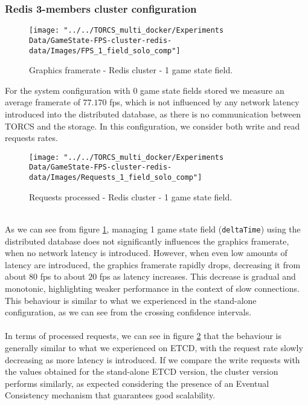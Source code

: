\subsubsection{Redis 3-members cluster configuration}
\begin{figure}[h!]
	\centering
	\texttt{[image: "../../TORCS\_multi\_docker/Experiments Data/GameState-FPS-cluster-redis-data/Images/FPS\_1\_field\_solo\_comp"]}
	\caption[Graphics framerate - Redis cluster - 1 game state field]{Graphics framerate - Redis cluster - 1 game state field.}
	\label{fig:fps-1-field-redis-cluster}
\end{figure}
For the system configuration with 0 game state fields stored we measure an average framerate of $77.170$ fps, which is not influenced by any network latency introduced into the distributed database, as there is no communication between TORCS and the storage. In this configuration, we consider both write and read requests rates. \\
\begin{figure}[h!]
	\centering
	\texttt{[image: "../../TORCS\_multi\_docker/Experiments Data/GameState-FPS-cluster-redis-data/Images/Requests\_1\_field\_solo\_comp"]}
	\caption[Requests processed - Redis cluster - 1 game state field]{Requests processed - Redis cluster - 1 game state field.}
	\label{fig:requests-1-field-redis-cluster}
\end{figure}
\\ As we can see from figure \ref{fig:fps-1-field-redis-cluster}, managing 1 game state field (\texttt{deltaTime}) using the distributed database does not significantly influences the graphics framerate, when no network latency is introduced. However, when even low amounts of latency are introduced, the graphics framerate rapidly drops, decreasing it from about $80$ fps to about $20$ fps as latency increases. This decrease is gradual and monotonic, highlighting weaker performance in the context of slow connections. This behaviour is similar to what we experienced in the stand-alone configuration, as we can see from the crossing confidence intervals. \\ \\
In terms of processed requests, we can see in figure \ref{fig:requests-1-field-redis-cluster} that the behaviour is generally similar to what we experienced on ETCD, with the request rate slowly decreasing as more latency is introduced. If we compare the write requests with the values obtained for the stand-alone ETCD version, the cluster version performs similarly, as expected considering the presence of an Eventual Consistency mechanism that guarantees good scalability. \\
